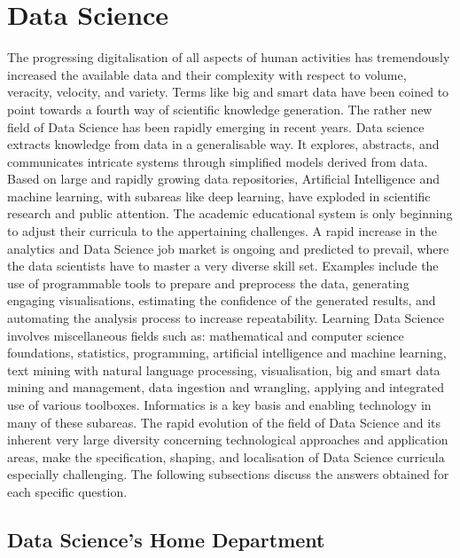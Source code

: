 \section{Data Science}

The progressing digitalisation of all aspects of human activities has tremendously increased the available data and their complexity with respect to volume, veracity, velocity, and variety. Terms like big and smart data have been coined to point towards a fourth way of scientific knowledge generation. The rather new field of Data Science has been rapidly emerging in recent years. Data science extracts knowledge from data in a generalisable way. It explores, abstracts, and communicates intricate systems through simplified models derived from data. Based on large and rapidly growing data repositories, Artificial Intelligence and machine learning, with subareas like deep learning, have exploded in scientific research and public attention. The academic educational system is only beginning to adjust their curricula to the appertaining challenges. A rapid increase in the analytics and Data Science job market is ongoing and predicted to prevail, where the data scientists have to master a very diverse skill set. Examples include the use of programmable tools to prepare and preprocess the data, generating engaging visualisations, estimating the confidence of the generated results, and automating the analysis process to increase repeatability. Learning Data Science involves miscellaneous fields such as: mathematical and computer science foundations, statistics, programming, artificial intelligence and machine learning, text mining with natural language processing, visualisation, big and smart data mining and management, data ingestion and wrangling, applying and integrated use of various toolboxes. Informatics is a key basis and enabling technology in many of these subareas. The rapid evolution of the field of Data Science and its inherent very large diversity concerning technological approaches and application areas, make the specification, shaping, and localisation of Data Science curricula especially challenging. The 
following subsections discuss the answers obtained for each specific
question.

\subsection{Data Science's Home Department}

